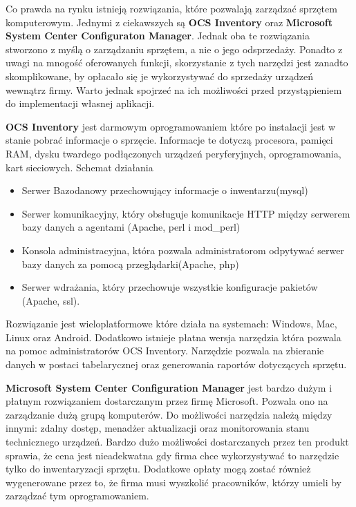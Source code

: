Co prawda na rynku istnieją rozwiązania, które pozwalają zarządzać sprzętem komputerowym. Jednymi z ciekawszych są \textbf{OCS Inventory} oraz \textbf{Microsoft System Center Configuraton Manager}. Jednak oba te rozwiązania stworzono z myślą o zarządzaniu sprzętem, a nie o jego odsprzedaży. Ponadto z uwagi na mnogość oferowanych funkcji, skorzystanie z tych narzędzi jest zanadto skomplikowane, by opłacało się je wykorzystywać do sprzedaży urządzeń wewnątrz firmy. Warto jednak spojrzeć na ich możliwości przed przystąpieniem do implementacji własnej aplikacji.

\textbf{OCS Inventory} jest darmowym oprogramowaniem które po instalacji jest w stanie pobrać informacje o sprzęcie. Informacje te dotyczą procesora, pamięci RAM, dysku twardego podłączonych urządzeń peryferyjnych, oprogramowania, kart sieciowych.
\newline
Schemat działania
\begin{itemize}
	\item Serwer Bazodanowy przechowujący informacje o inwentarzu(mysql)
	\item Serwer komunikacyjny, który obsługuje komunikacje HTTP między serwerem bazy danych a agentami (Apache, perl i mod\_perl)
	\item Konsola administracyjna, która pozwala administratorom odpytywać serwer bazy danych za pomocą przeglądarki(Apache, php)
	\item Serwer wdrażania, który przechowuje wszystkie konfiguracje pakietów (Apache, ssl).
\end{itemize}
Rozwiązanie jest wieloplatformowe które działa na systemach: Windows, Mac, Linux oraz Android. Dodatkowo istnieje płatna wersja narzędzia która pozwala na pomoc administratorów OCS Inventory. Narzędzie pozwala na zbieranie danych w postaci tabelarycznej oraz generowania raportów dotyczących sprzętu. 

\textbf{Microsoft System Center Configuration Manager} jest bardzo dużym i płatnym rozwiązaniem dostarczanym przez firmę Microsoft. Pozwala ono na zarządzanie dużą grupą komputerów. Do możliwości narzędzia należą między innymi: zdalny dostęp, menadżer aktualizacji oraz monitorowania stanu technicznego urządzeń. Bardzo dużo możliwości dostarczanych przez ten produkt sprawia, że cena jest nieadekwatna gdy firma chce wykorzystywać to narzędzie tylko do inwentaryzacji sprzętu. Dodatkowe opłaty mogą zostać również wygenerowane przez to, że firma musi wyszkolić pracowników, którzy umieli by zarządzać tym oprogramowaniem.



